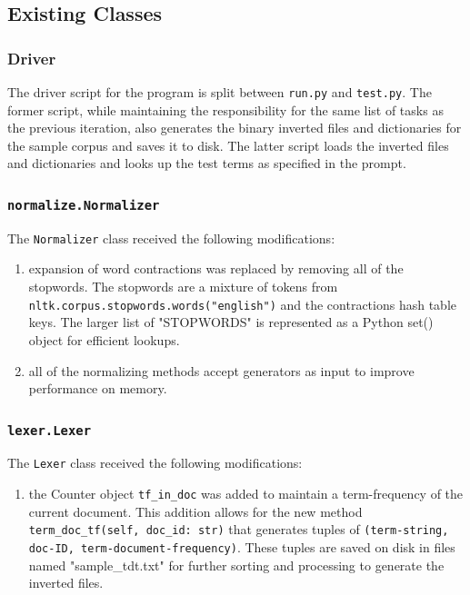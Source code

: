 \documentclass[11pt]{article}
\begin{document}
\subsection{Existing Classes}

\subsubsection{Driver} \label{sec:driver}
The driver script for the program is split between \texttt{run.py} and \texttt{test.py}. The former script, while maintaining the responsibility for the same list of tasks as the previous iteration, also generates the binary inverted files and dictionaries for the sample corpus and saves it to disk. The latter script loads the inverted files and dictionaries and looks up the test terms as specified in the prompt.

\subsubsection{\texttt{normalize.Normalizer}}
The \texttt{Normalizer} class received the following modifications:

\begin{enumerate}
    \item expansion of word contractions was replaced by removing all of the stopwords. The stopwords are a mixture of tokens from \texttt{nltk.corpus.stopwords.words("english")} and the contractions hash table keys. The larger list of "STOPWORDS" is represented as a Python set() object for efficient lookups.

    \item all of the normalizing methods accept generators as input to improve performance on memory.
\end{enumerate}

\subsubsection{\texttt{lexer.Lexer}}
The \texttt{Lexer} class received the following modifications:
\begin{enumerate}
    \item the Counter object \texttt{tf\_in\_doc} was added to maintain a term-frequency of the current document. This addition allows for the new method \texttt{term\_doc\_tf(self, doc\_id: str)} that generates tuples of \texttt{(term-string, doc-ID, term-document-frequency)}. These tuples are saved on disk in files named "sample\_tdt.txt" for further sorting and processing to generate the inverted files.
\end{enumerate}
\end{document}
